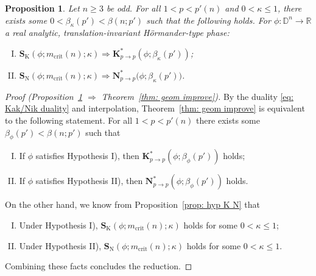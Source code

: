 \documentclass[reqno]{amsart}
\numberwithin{equation}{section}
\newcommand{\D}{\mathbb{D}}
\newcommand{\R}{\mathbb{R}}
\newcommand{\bK}{\mathbf{K}}
\newcommand{\bN}{\mathbf{N}}
\newcommand{\bS}{\mathbf{S}}
\theoremstyle{plain}
\newtheorem{proposition}[theorem]{Proposition}
\theoremstyle{definition}
\newcommand{\tK}{\mathrm{K}}
\newcommand{\tN}{\mathrm{N}}
\newcommand{\crit}{\mathrm{crit}}
\begin{document}
\begin{proposition}\label{prop: geom improve redux} Let $n \geq 3$ be odd. For all $1 < p < p'(n)$ and $0 < \kappa \leq 1$, there exists some $0 < \beta_{\kappa}(p') < \beta(n;p')$ such that the following holds. For $\phi \colon \D^n \to \R$ a real analytic, translation-invariant H\"ormander-type phase:
\begin{enumerate}[I)]
    \item $\bS_{\tK}(\phi; m_{\crit}(n); \kappa) \Rightarrow \bK_{p \to p}^*(\phi; \beta_{\kappa}(p'))$;
    \item $\bS_{\tN}(\phi; m_{\crit}(n); \kappa) \Rightarrow \bN_{p \to p}^*\big(\phi; \beta_{\kappa}(p'))$.
\end{enumerate}
\end{proposition}

\begin{proof}[Proof (Proposition~\ref{prop: geom improve redux} $\Rightarrow$ Theorem~\ref{thm: geom improve})]
 By the duality \eqref{eq: Kak/Nik duality} and interpolation, Theorem~\ref{thm: geom improve} is equivalent to the following statement. For all $1 < p < p'(n)$ there exists some $\beta_{\phi}(p') < \beta(n;p')$ such that
 \begin{enumerate}[I)]
     \item If $\phi$ satisfies Hypothesis I), then $\bK_{p \to p}^*(\phi; \beta_{\phi}(p'))$ holds;
    \item If $\phi$ satisfies Hypothesis II), then $\bN_{p \to p}^*(\phi; \beta_{\phi}(p'))$ holds. 
 \end{enumerate}
  On the other hand, we know from Proposition~\ref{prop: hyp K N} that
\begin{enumerate}[I)]
    \item Under Hypothesis I), $\bS_{\tK}(\phi; m_{\crit}(n); \kappa)$ holds for some $0 < \kappa \leq 1$; 
    \item Under Hypothesis II), $\bS_{\tN}(\phi;m_{\crit}(n); \kappa)$ holds for some $0 < \kappa \leq 1$.
\end{enumerate}
Combining these facts concludes the reduction.
\end{proof}




\end{document}
